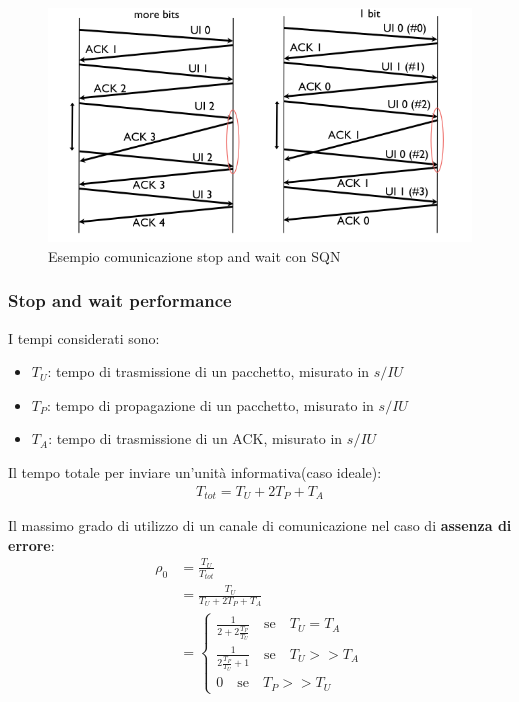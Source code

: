 \begin{figure}[!ht]
	\centering
	\includegraphics[width=0.4\columnwidth]{./images/esempio_comunicazione_stop_wait_sqn.png}
	\caption{Esempio comunicazione stop and wait con SQN}
	\label{fig:esempio_comunicazione_stop_wait_sqn}
\end{figure}



\subsubsection{Stop and wait performance}

I tempi considerati sono:
\begin{itemize}
	\item \textbf{$T_U$}: tempo di trasmissione di un pacchetto, misurato in $s/IU$
	\item \textbf{$T_P$}: tempo di propagazione di un pacchetto, misurato in $s/IU$
	\item \textbf{$T_{A}$}: tempo di trasmissione di un ACK, misurato in $s/IU$
\end{itemize}

Il tempo totale per inviare un'unità informativa(caso ideale):
\begin{align}
	T_{tot} = T_{U} + 2T_{P} + T_{A}
\end{align}

Il massimo grado di utilizzo di un canale di comunicazione nel caso di \textbf{assenza di errore}:
\begin{align}
	\rho_0
	 & =\frac{T_U}{T_{tot}}                                                     \\
	 & = \frac{T_U}{T_U + 2T_P + T_A}                                           \\
	 & = \begin{cases}
		     \frac{1}{2 + 2 \frac{T_P}{T_U}} \quad \text{se}\quad T_U = T_A  \\
		     \frac{1}{2 \frac{T_P}{T_U} + 1} \quad \text{se}\quad T_U >> T_A \\
		     0 \quad \text{se}\quad T_P >> T_U
	     \end{cases}
\end{align}



